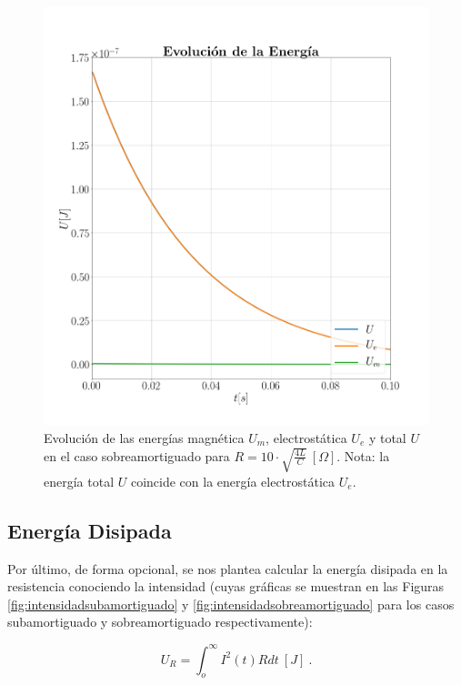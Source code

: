 \documentclass[journal]{IEEEtran}
\begin{document}
\begin{figure}[!htb]
    \centering
    \includegraphics[width=\linewidth,trim={40 70 70 70},clip]{energiasobreamortiguado.png}
    \caption{Evolución de las energías magnética $U_m$, electrostática $U_e$ y total $U$ en el caso sobreamortiguado para $R=10 \cdot\sqrt{\frac{4L}{C}}~[\Omega]$. Nota: la energía total $U$ coincide con la energía electrostática $U_e$.}
    \label{fig:energiasobreamortiguado}
\end{figure}

\clearpage

\subsection{Energía Disipada}

Por último, de forma opcional, se nos plantea calcular la energía disipada en la resistencia conociendo la intensidad (cuyas gráficas se muestran en las Figuras \ref{fig:intensidadsubamortiguado} y \ref{fig:intensidadsobreamortiguado} para los casos subamortiguado y sobreamortiguado respectivamente):

\begin{equation}
U_R = \int_o^\infty I^2(t)R dt~[J]~.
\end{equation}
\end{document}
